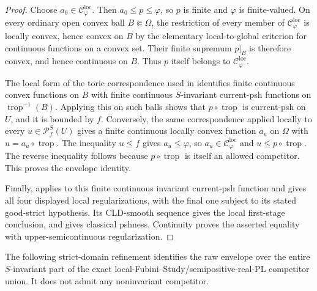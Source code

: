 \begin{proof}
Choose \(a_0\in\mathcal C^{\mathrm{loc}}_\varphi\).  Then
\(a_0\leq p\leq\varphi\), so \(p\) is finite and \(\varphi\) is
finite-valued.  On every ordinary open convex ball \(B\Subset\Omega\), the
restriction of every member of \(\mathcal C^{\mathrm{loc}}_\varphi\) is
locally convex, hence convex on \(B\) by the elementary local-to-global
criterion for continuous functions on a convex set.  Their finite supremum
\(p|_B\) is therefore convex, and hence continuous on \(B\).  Thus \(p\)
itself belongs to
\(\mathcal C^{\mathrm{loc}}_\varphi\).

The local form of the toric correspondence used in
 identifies finite
continuous convex functions on \(B\) with finite continuous
\(S\)-invariant current-psh functions on
\(\operatorname{trop}^{-1}(B)\).  Applying this on such balls shows that
\(p\circ\operatorname{trop}\) is current-psh on \(U\), and it is bounded by
\(f\).  Conversely, the same correspondence applied locally to every
\(u\in\mathcal P^S_f(U)\) gives a finite continuous locally convex function
\(a_u\) on \(\Omega\) with \(u=a_u\circ\operatorname{trop}\).  The inequality
\(u\leq f\) gives \(a_u\leq\varphi\), so \(a_u\in
\mathcal C^{\mathrm{loc}}_\varphi\) and \(u\leq p\circ\operatorname{trop}\).
The reverse inequality follows because \(p\circ\operatorname{trop}\) is
itself an allowed competitor.  This proves the envelope identity.

Finally,  applies to
this finite continuous invariant current-psh function and gives all four
displayed local regularizations, with the final one subject to its stated
good-strict hypothesis.  Its CLD-smooth sequence gives the local first-stage
conclusion, and  gives classical pshness.
Continuity proves the asserted equality with upper-semicontinuous
regularization.
\end{proof}

The following strict-domain refinement identifies the raw envelope over the
entire \(S\)-invariant part of the exact local-Fubini--Study/semipositive-real-PL
competitor union.  It does not admit any noninvariant competitor.



